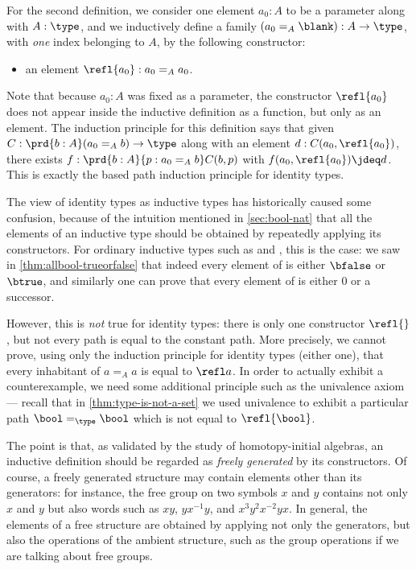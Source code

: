 For the second definition, we consider one element $a_0:A$ to be a parameter along with $A:\type$, and we inductively define a family $(a_0 =_A \blank):A\to \type$, with \emph{one} index belonging to $A$, by the following constructor:
\begin{itemize}
\item an element $\refl{a_0} : a_0 =_A a_0$.
\end{itemize}
Note that because $a_0:A$ was fixed as a parameter, the constructor $\refl{a_0}$ does not appear inside the inductive definition as a function, but only as an element.
The induction principle for this definition says that given $C:\prd{b:A} (a_0 =_A b) \to \type$ along with an element $d:C(a_0,\refl{a_0})$, there exists $f:\prd{b:A}{p:a_0 =_A b} C(b,p)$ with $f(a_0,\refl{a_0})\jdeq d$.
This is exactly the based path induction principle for identity types.

The view of identity types as inductive types has historically caused some confusion, because of the intuition mentioned in \cref{sec:bool-nat} that all the elements of an inductive type should be obtained by repeatedly applying its constructors.
For ordinary inductive types such as \bool and \nat, this is the case: we saw in \cref{thm:allbool-trueorfalse} that indeed every element of \bool is either $\bfalse$ or $\btrue$, and similarly one can prove that every element of \nat is either $0$ or a successor.

However, this is \emph{not} true for identity types: there is only one constructor $\refl{}$, but not every path is equal to the constant path.
More precisely, we cannot prove, using only the induction principle for identity types (either one), that every inhabitant of $a=_A a$ is equal to $\refl a$.
In order to actually exhibit a counterexample, we need some additional principle such as the univalence axiom --- recall that in \cref{thm:type-is-not-a-set} we used univalence to exhibit a particular path $\bool=_\type\bool$ which is not equal to $\refl{\bool}$.

%
%
The point is that, as validated by the study of homotopy-initial algebras, an inductive definition should be regarded as \emph{freely generated} by its constructors.
Of course, a freely generated structure may contain elements other than its generators: for instance, the free group on two symbols $x$ and $y$ contains not only $x$ and $y$ but also words such as $xy$, $yx^{-1}y$, and $x^3y^2x^{-2}yx$.
In general, the elements of a free structure are obtained by applying not only the generators, but also the operations of the ambient structure, such as the group operations if we are talking about free groups.

